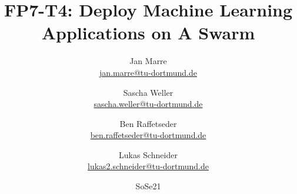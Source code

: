 \subject{Documentation of the Fachprojekt}
\title{FP7-T4: Deploy Machine Learning Applications on A Swarm} 

\author{Jan Marre\\\href{mailto:jan.marre@tu-dortmund.de}{jan.marre@tu-dortmund.de}\and Sascha Weller\\ \href{mailto:sascha.weller@tu-dortmund.de}{sascha.weller@tu-dortmund.de} \and Ben Raffetseder\\\href{mailto:ben.raffetseder@tu-dortmund.de}{ben.raffetseder@tu-dortmund.de} \and Lukas Schneider\\\href{mailto:lukas2.schneider@tu-dortmund.de}{lukas2.schneider@tu-dortmund.de}}
\publishers{TU Dortmund – Fakultät Informatik}

\date{SoSe21}
